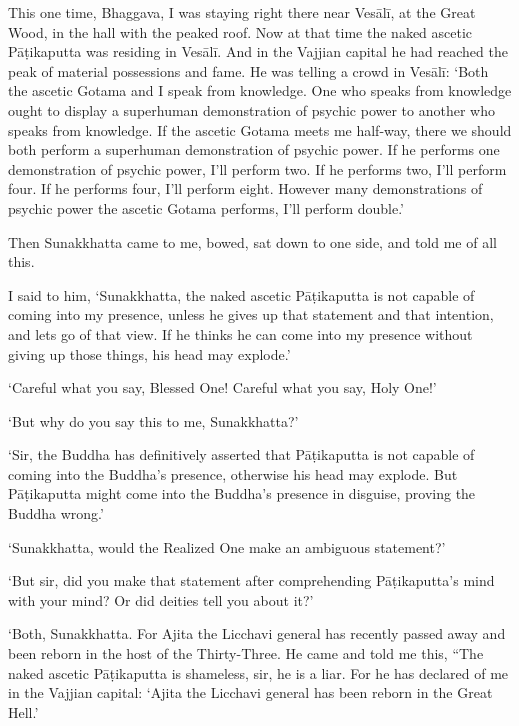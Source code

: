 \documentclass[12pt,openany]{book}%
\begin{document}
This one time, Bhaggava, I was staying right there near \textsanskrit{Vesālī}, at the Great Wood, in the hall with the peaked roof. Now at that time the naked ascetic \textsanskrit{Pāṭikaputta} was residing in \textsanskrit{Vesālī}. And in the Vajjian capital he had reached the peak of material possessions and fame. He was telling a crowd in \textsanskrit{Vesālī}: ‘Both the ascetic Gotama and I speak from knowledge. One who speaks from knowledge ought to display a superhuman demonstration of psychic power to another who speaks from knowledge. If the ascetic Gotama meets me half-way, there we should both perform a superhuman demonstration of psychic power. If he performs one demonstration of psychic power, I’ll perform two. If he performs two, I’ll perform four. If he performs four, I’ll perform eight. However many demonstrations of psychic power the ascetic Gotama performs, I’ll perform double.’ 

Then Sunakkhatta came to me, bowed, sat down to one side, and told me of all this. 

I said to him, ‘Sunakkhatta, the naked ascetic \textsanskrit{Pāṭikaputta} is not capable of coming into my presence, unless he gives up that statement and that intention, and lets go of that view. If he thinks he can come into my presence without giving up those things, his head may explode.’ 

‘Careful what you say, Blessed One! Careful what you say, Holy One!’ 

‘But why do you say this to me, Sunakkhatta?’ 

‘Sir, the Buddha has definitively asserted that \textsanskrit{Pāṭikaputta} is not capable of coming into the Buddha’s presence, otherwise his head may explode. But \textsanskrit{Pāṭikaputta} might come into the Buddha’s presence in disguise, proving the Buddha wrong.’ 

‘Sunakkhatta, would the Realized One make an ambiguous statement?’ 

‘But sir, did you make that statement after comprehending \textsanskrit{Pāṭikaputta}’s mind with your mind? Or did deities tell you about it?’ 

‘Both, Sunakkhatta. For Ajita the Licchavi general has recently passed away and been reborn in the host of the Thirty-Three. He came and told me this, “The naked ascetic \textsanskrit{Pāṭikaputta} is shameless, sir, he is a liar. For he has declared of me in the Vajjian capital: ‘Ajita the Licchavi general has been reborn in the Great Hell.’ 
\end{document}
